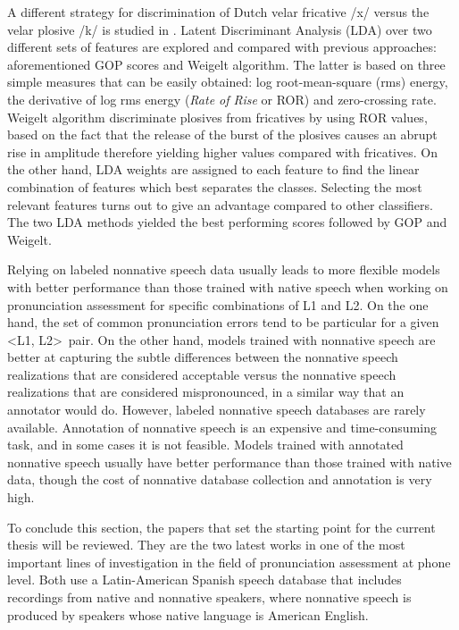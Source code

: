A different strategy for discrimination of Dutch velar fricative /x/ versus the velar plosive
/k/ is studied in \cite{lda_weigelt}. Latent Discriminant Analysis (LDA) over two different sets
of features are explored and compared with previous approaches: aforementioned GOP scores and
Weigelt algorithm. The latter is based on three simple measures that can be easily obtained:
log root-mean-square (rms) energy, the derivative of log rms energy (\textit{Rate of Rise} or
ROR) and zero-crossing rate. Weigelt algorithm discriminate plosives from fricatives by using
ROR values, based on the fact that the release of the burst of the plosives causes an abrupt
rise in amplitude therefore yielding higher values compared with fricatives.
On the other hand, LDA weights are assigned to each feature to
find the linear combination of features
which best separates the classes. Selecting the most relevant features turns out to give an
advantage compared to other classifiers. The two LDA methods yielded the best performing
scores followed by GOP and Weigelt.

Relying on labeled nonnative speech data usually leads to more flexible models
with better performance than those trained with native speech
when working on pronunciation assessment for specific combinations of L1 and L2. On the one hand,
the set of common pronunciation errors tend to be particular for a given \textless L1, L2\textgreater \ pair. On the other hand, models trained
with nonnative speech are better at capturing the subtle differences between the nonnative
speech realizations that are considered acceptable versus the nonnative speech realizations
that are considered mispronounced, in a similar way that an annotator would do.
However, labeled nonnative speech databases are rarely available. Annotation
of nonnative speech is an expensive and time-consuming task, and in some cases it is not feasible.
Models trained with annotated nonnative speech usually have better performance
than those trained with native data, though the cost of nonnative database
collection and annotation is very high.

To conclude this section, the papers that set the starting point for the current thesis will
be reviewed. They are the two latest works in one of the most important lines of investigation
in the field of pronunciation assessment at phone level.
Both use a Latin-American Spanish speech database that includes recordings from
native and nonnative speakers, where nonnative speech
is produced by speakers whose native language is American English.

